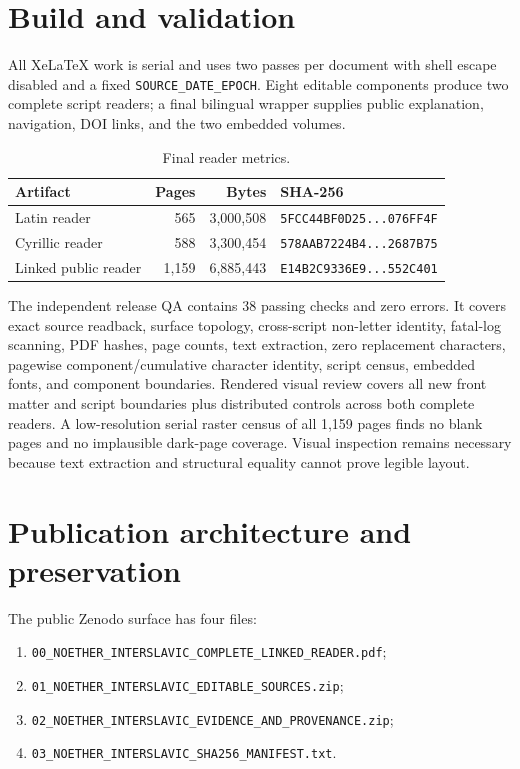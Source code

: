 \documentclass[11pt]{article}
\newcommand{\code}[1]{\texttt{#1}}
\begin{document}
\section{Build and validation}

All XeLaTeX work is serial and uses two passes per document with shell escape disabled and a fixed \code{SOURCE\_DATE\_EPOCH}. Eight editable components produce two complete script readers; a final bilingual wrapper supplies public explanation, navigation, DOI links, and the two embedded volumes.

\begin{table}[ht]
\centering
\caption{Final reader metrics.}\label{tab:metrics}
\begin{tabular}{@{}lrrl@{}}
\toprule
Artifact & Pages & Bytes & SHA-256\\
\midrule
Latin reader & 565 & 3,000,508 & \code{5FCC44BF0D25...076FF4F}\\
Cyrillic reader & 588 & 3,300,454 & \code{578AAB7224B4...2687B75}\\
Linked public reader & 1,159 & 6,885,443 & \code{E14B2C9336E9...552C401}\\
\bottomrule
\end{tabular}
\end{table}

The independent release QA contains 38 passing checks and zero errors. It covers exact source readback, surface topology, cross-script non-letter identity, fatal-log scanning, PDF hashes, page counts, text extraction, zero replacement characters, pagewise component/cumulative character identity, script census, embedded fonts, and component boundaries. Rendered visual review covers all new front matter and script boundaries plus distributed controls across both complete readers. A low-resolution serial raster census of all 1,159 pages finds no blank pages and no implausible dark-page coverage. Visual inspection remains necessary because text extraction and structural equality cannot prove legible layout.

\section{Publication architecture and preservation}

The public Zenodo surface has four files:

\begin{enumerate}
\item \code{00\_NOETHER\_INTERSLAVIC\_COMPLETE\_LINKED\_READER.pdf};
\item \code{01\_NOETHER\_INTERSLAVIC\_EDITABLE\_SOURCES.zip};
\item \code{02\_NOETHER\_INTERSLAVIC\_EVIDENCE\_AND\_PROVENANCE.zip};
\item \code{03\_NOETHER\_INTERSLAVIC\_SHA256\_MANIFEST.txt}.
\end{enumerate}
\end{document}
